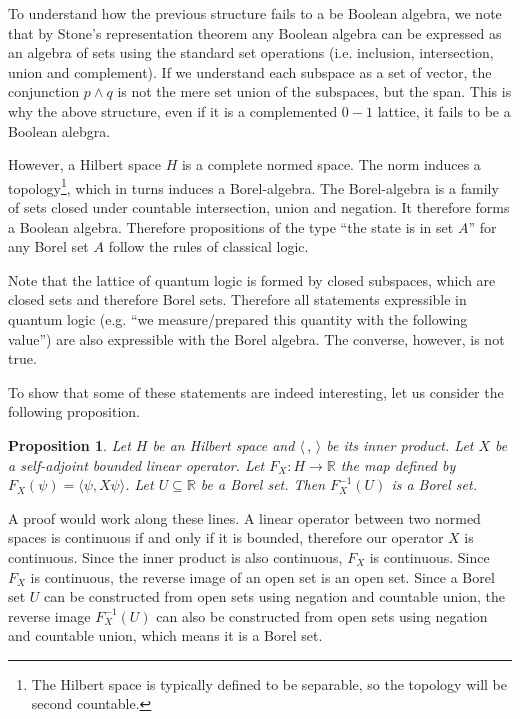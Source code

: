 \documentclass[10pt,twocolumn, nofootinbib]{revtex4-1}
\newtheorem{prop}[equation]{Proposition}
\begin{document}
To understand how the previous structure fails to a be Boolean algebra, we note that by Stone's representation theorem any Boolean algebra can be expressed as an algebra of sets using the standard set operations (i.e. inclusion, intersection, union and complement). If we understand each subspace as a set of vector, the conjunction $p \wedge q$ is not the mere set union of the subspaces, but the span. This is why the above structure, even if it is a complemented $0-1$ lattice, it fails to be a Boolean alebgra.

However, a Hilbert space $H$ is a complete normed space. The norm induces a topology\footnote{The Hilbert space is typically defined to be separable, so the topology will be second countable.}, which in turns induces a Borel-algebra. The Borel-algebra is a family of sets closed under countable intersection, union and negation. It therefore forms a Boolean algebra. Therefore propositions of the type ``the state is in set $A$'' for any Borel set $A$ follow the rules of classical logic.

Note that the lattice of quantum logic is formed by closed subspaces, which are closed sets and therefore Borel sets. Therefore all statements expressible in quantum logic (e.g. ``we measure/prepared this quantity with the following value'') are also expressible with the Borel algebra. The converse, however, is not true.

To show that some of these statements are indeed interesting, let us consider the following proposition.
\begin{prop}
	Let $H$ be an Hilbert space and $\langle \, , \, \rangle$ be its inner product. Let $X$ be a self-adjoint bounded linear operator. Let $F_X : H \to \mathbb{R}$ the map defined by $F_X(\psi) = \langle \psi , X \psi \rangle$. Let $U \subseteq \mathbb{R}$ be a Borel set. Then $F_X^{-1}(U)$ is a Borel set.
\end{prop}

A proof would work along these lines. A linear operator between two normed spaces is continuous if and only if it is bounded, therefore our operator $X$ is continuous. Since the inner product is also continuous, $F_X$ is continuous. Since $F_X$ is continuous, the reverse image of an open set is an open set. Since a Borel set $U$ can be constructed from open sets using negation and countable union, the reverse image $F_X^{-1}(U)$ can also be constructed from open sets using negation and countable union, which means it is a Borel set.
\end{document}
